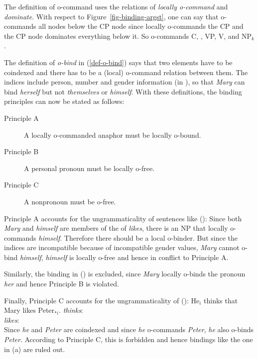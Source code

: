\documentclass[output=paper
 	        ,biblatex
                ,babelshorthands
                ,newtxmath
                ,draftmode
                ,colorlinks, citecolor=brown
]{langscibook}
\begin{document}
The definition of o-command uses the relations of \emph{locally o-command} and \emph{dominate}. With respect to
Figure~\ref{fig-binding-argst}, one can say that \NPi o-commands all nodes below the CP node since
\NPi locally o-commands the CP and the CP node dominates everything below it. So \NPi o-commands
C, \NPj, VP, V, and NP$_k$.

The definition of \emph{o-bind} in (\ref{def-o-bind}) says that two elements have to be coindexed
and there has to be a (local) o-command relation between them. The indices include person, number
and gender information (in ), so that \emph{Mary} can bind \emph{herself} but not
\emph{themselves} or \emph{himself}. With these definitions, the binding principles can now be stated
as follows:

\begin{principle-break}
\begin{description}
\item [Principle A] A locally o-commanded anaphor must be locally o-bound.
\item [Principle B] A personal pronoun must be locally o-free.
\item [Principle C] A nonpronoun must be o-free.
\end{description}
\end{principle-break}

\noindent
Principle A accounts for the ungrammaticality of sentences like ():
\eal
{}
\zl
Since both \emph{Mary} and \emph{himself} are members of the \argstl of \emph{likes}, there is an NP
that locally o-commands \emph{himself}. Therefore there should be a local o-binder. But since the
indices are incompatible because of incompatible gender values, \emph{Mary} cannot o-bind
\emph{himself}, \emph{himself} is locally o-free and hence in conflict to Principle A.

Similarly, the binding in () is excluded, since \emph{Mary} locally o-binds the pronoun \emph{her}
and hence Principle B is violated.
\eal
{}
\zl

\noindent
Finally, Principle C accounts for the ungrammaticality of ():
\eal
\ex He$_i$ thinks that Mary likes Peter$_{*i}$.
\ex \emph{thinks}:\\
\argst {}
\ex \emph{likes}:\\
\argst {}
\zl
Since \emph{he} and \emph{Peter} are coindexed and since \emph{he} o-commands \emph{Peter},
\emph{he} also o-binds \emph{Peter}. According to Principle C, this is forbidden and hence bindings
like the one in (a) are ruled out.
\end{document}
